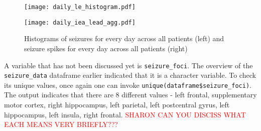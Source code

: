 \begin{figure}[H]
  \begin{minipage}[b]{0.5\linewidth}
    \centering
    \texttt{[image: daily\_le\_histogram.pdf]}

  \end{minipage}
  \begin{minipage}[b]{0.5\linewidth}
    \centering
    \texttt{[image: daily\_iea\_lead\_agg.pdf]}
  \end{minipage}
  \label{fig:daily_seizures}
  \caption{Histograms of seizures for every day across all patients (left) and seizure spikes for every day across all patients (right)}
\end{figure}
A variable that has not been discussed yet is \verb|seizure_foci|. The overview of the \verb|seizure_data| dataframe earlier indicated that it is a character variable. To check its unique values, once again one can invoke \verb|unique(dataframe$seizure_foci)|. The output indicates that there are 8 different values - left frontal, supplementary motor cortex, right hippocampus, left parietal, left postcentral gyrus, left hippocampus, left insula, right frontal. \textcolor{red}{SHARON CAN YOU DISCISS WHAT EACH MEANS VERY BRIEFLY???}

